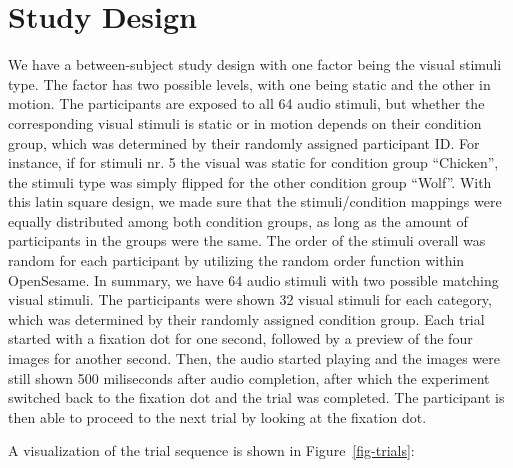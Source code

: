 \documentclass[
  12pt,
  letterpaper,
  DIV=11,
  numbers=noendperiod]{scrreprt}
\begin{document}
\section{Study Design}\label{study-design}

We have a between-subject study design with one factor being the visual
stimuli type. The factor has two possible levels, with one being static
and the other in motion. The participants are exposed to all 64 audio
stimuli, but whether the corresponding visual stimuli is static or in
motion depends on their condition group, which was determined by their
randomly assigned participant ID. For instance, if for stimuli nr. 5 the
visual was static for condition group ``Chicken'', the stimuli type was
simply flipped for the other condition group ``Wolf''. With this latin
square design, we made sure that the stimuli/condition mappings were
equally distributed among both condition groups, as long as the amount
of participants in the groups were the same. The order of the stimuli
overall was random for each participant by utilizing the random order
function within OpenSesame. In summary, we have 64 audio stimuli with
two possible matching visual stimuli. The participants were shown 32
visual stimuli for each category, which was determined by their randomly
assigned condition group. Each trial started with a fixation dot for one
second, followed by a preview of the four images for another second.
Then, the audio started playing and the images were still shown 500
miliseconds after audio completion, after which the experiment switched
back to the fixation dot and the trial was completed. The participant is
then able to proceed to the next trial by looking at the fixation dot.

A visualization of the trial sequence is shown in
Figure~\ref{fig-trials}:
\end{document}
